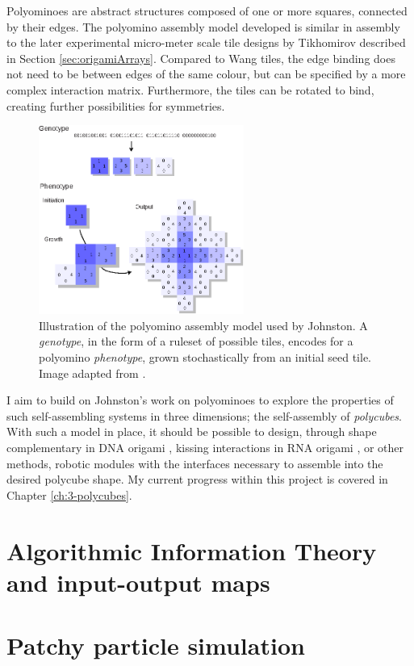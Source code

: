 
Polyominoes are abstract structures composed of one or more squares, connected by their edges. The polyomino assembly model developed is similar in assembly to the later experimental micro-meter scale tile designs by Tikhomirov \cite{tikhomirov2017fractal} described in Section \ref{sec:origamiArrays}. Compared to Wang tiles\cite{wang1961proving}, the edge binding does not need to be between edges of the same colour, but can be specified by a more complex interaction matrix. Furthermore, the tiles can be rotated to bind, creating further possibilities for symmetries.

\begin{figure}[h]
    \centering\includegraphics[width=0.6\textwidth]{figures/polyominoes.eps}
    \caption{Illustration of the polyomino assembly model used by Johnston. A \emph{genotype}, in the form of a ruleset of possible tiles, encodes for a polyomino \emph{phenotype}, grown stochastically from an initial seed tile. Image adapted from \cite{johnston2011evolutionary}.}
    \label{fig:polyominoes}
\end{figure}

I aim to build on Johnston's work on polyominoes to explore the properties of such self-assembling systems in three dimensions; the self-assembly of \emph{polycubes}. With such a model in place, it should be possible to design, through shape complementary in DNA origami \cite{wagenbauer2017gigadalton}, kissing interactions in RNA origami \cite{geary2014single}, or other methods, robotic modules with the interfaces necessary to assemble into the desired polycube shape. My current progress within this project is covered in Chapter \ref{ch:3-polycubes}.

\section{Algorithmic Information Theory and input-output maps}

\section{Patchy particle simulation}
